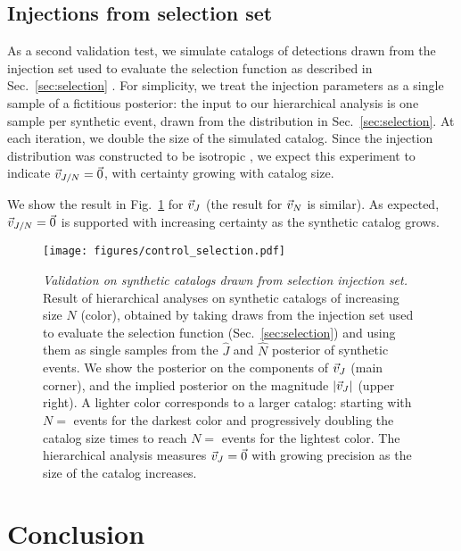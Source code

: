 \documentclass[aps,prd,twocolumn,superscriptaddress,preprintnumbers,floatfix,nofootinbib]{revtex4-2}
\newcommand{\Nitersel}{}
\newcommand{\Nstartsel}{}
\newcommand{\Nmaxsel}{}
\begin{document}
\subsection{Injections from selection set}
\label{sec:validation:selection}

As a second validation test, we simulate catalogs of detections drawn from the injection set used to evaluate the selection function as described in Sec.~\ref{sec:selection} \cite{o3-selection}.
For simplicity, we treat the injection parameters as a single sample of a fictitious posterior: the input to our hierarchical analysis is one sample per synthetic event, drawn from the distribution in Sec.~\ref{sec:selection}.
At each iteration, we double the size of the simulated catalog.
Since the injection distribution was constructed to be isotropic \cite{o3-selection}, we expect this experiment to indicate $\vec{v}_{J/N} = \vec{0}$, with certainty growing with catalog size.

We show the result in Fig.~\ref{fig:control-sel} for $\vec{v}_{J}$ (the result for $\vec{v}_{N}$ is similar).
As expected, $\vec{v}_{J/N} = \vec{0}$ is supported with increasing certainty as the synthetic catalog grows.

\begin{figure}
\texttt{[image: figures/control\_selection.pdf]}
\caption{\emph{Validation on synthetic catalogs drawn from selection injection set.}
Result of hierarchical analyses on synthetic catalogs of increasing size $N$ (color), obtained by taking draws from the injection set used to evaluate the selection function (Sec.~\ref{sec:selection}) and using them as single samples from the $\hat{J}$ and $\hat{N}$ posterior of synthetic events.
We show the posterior on the components of $\vec{v}_{J}$ (main corner), and the implied posterior on the magnitude $|\vec{v}_{J}|$ (upper right).
A lighter color corresponds to a larger catalog: starting with $N = \Nstartsel$ events for the darkest color and progressively doubling the catalog size \Nitersel times to reach $N = \Nmaxsel$ events for the lightest color.
The hierarchical analysis measures $\vec{v}_{J} = \vec{0}$ with growing precision as the size of the catalog increases.
}
\label{fig:control-sel}
\end{figure}

\section{Conclusion}
\label{sec:conclusion}
\end{document}
